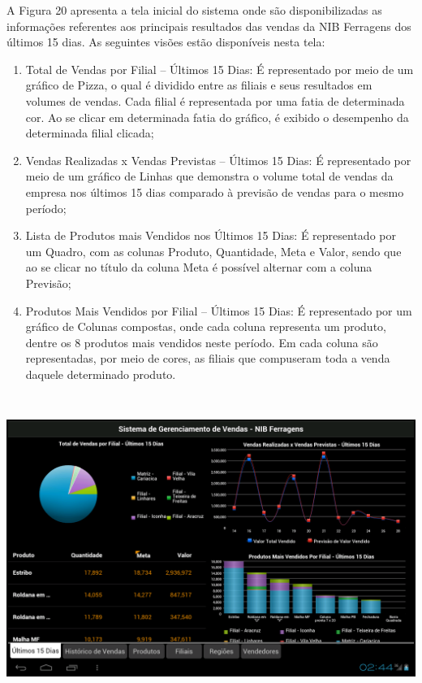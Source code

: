 \documentclass[a4paper]{article}
\newcommand\liststyleWWviiiNumxx{%
\renewcommand\theenumi{\alph{enumi}}
\renewcommand\theenumii{\alph{enumii}}
\renewcommand\theenumiii{\roman{enumiii}}
\renewcommand\theenumiv{\arabic{enumiv}}
\renewcommand\labelenumi{\theenumi)}
\renewcommand\labelenumii{\theenumii.}
\renewcommand\labelenumiii{\theenumiii.}
\renewcommand\labelenumiv{\theenumiv.}
}
\begin{document}
{
\textsf{A Figura 20 apresenta a tela inicial do sistema onde s\~ao disponibilizadas as informa\c{c}\~oes referentes aos
principais resultados das vendas da NIB Ferragens dos \'ultimos 15 dias. As seguintes vis\~oes est\~ao dispon\'iveis
nesta tela:}}

\liststyleWWviiiNumxx
\begin{enumerate}
\item {
\textsf{Total de Vendas por Filial -- \'Ultimos 15 Dias: \'E representado por meio de um gr\'afico de Pizza, o qual \'e
dividido entre as filiais e seus resultados em volumes de vendas. Cada filial \'e representada por uma fatia de
determinada cor. Ao se clicar em determinada fatia do gr\'afico, \'e exibido o desempenho da determinada filial
clicada;}}
\item {
\textsf{Vendas Realizadas x Vendas Previstas -- \'Ultimos 15 Dias: \'E representado por meio de um gr\'afico de Linhas
que demonstra o volume total de vendas da empresa nos \'ultimos 15 dias comparado \`a previs\~ao de vendas para o mesmo
per\'iodo;}}
\item {
\textsf{Lista de Produtos mais Vendidos nos \'Ultimos 15 Dias: \'E representado por um Quadro, com as colunas Produto,
Quantidade, Meta e Valor, sendo que ao se clicar no t\'itulo da coluna Meta \'e poss\'ivel alternar com a coluna
Previs\~ao;}}
\item {
\textsf{Produtos Mais Vendidos por Filial -- \'Ultimos 15 Dias: \'E representado por um gr\'afico de Colunas compostas,
onde cada coluna representa um produto, dentre os 8 produtos mais vendidos neste per\'iodo. Em cada coluna s\~ao
representadas, por meio de cores, as filiais que compuseram toda a venda daquele determinado produto.}}
\end{enumerate}
 \includegraphics[width=15.968cm,height=10.026cm]{monograph-img020.png} 
\end{document}
